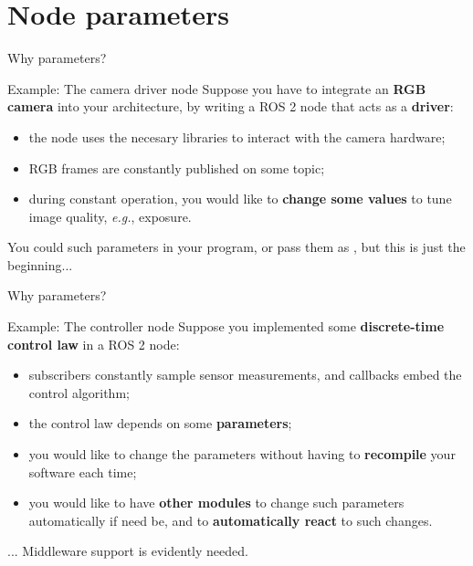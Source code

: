 
\section{Node parameters}

\begin{frame}{Why parameters?}
	\begin{exampleblock}{Example: The camera driver node}
		Suppose you have to integrate an \textbf{RGB camera} into your architecture, by writing a ROS 2 node that acts as a \textbf{driver}:
		\begin{itemize}
			\item the node uses the necesary libraries to interact with the camera hardware;
			\item RGB frames are constantly published on some topic;
			\item during constant operation, you would like to \textbf{change some values} to tune image quality, \emph{e.g.}, exposure.
		\end{itemize}
	\end{exampleblock}
	You could  such parameters in your program, or pass them as , but this is just the beginning...
\end{frame}
\begin{frame}{Why parameters?}
	\begin{exampleblock}{Example: The controller node}
		Suppose you implemented some \textbf{discrete-time control law} in a ROS 2 node:
		\begin{itemize}
			\item subscribers constantly sample sensor measurements, and callbacks embed the control algorithm;
			\item the control law depends on some \textbf{parameters};
			\item you would like to change the parameters without having to \textbf{recompile} your software each time;
			\item you would like to have \textbf{other modules} to change such parameters automatically if need be, and to \textbf{automatically react} to such changes.
		\end{itemize}
	\end{exampleblock}
	... Middleware support is evidently needed.
\end{frame}

